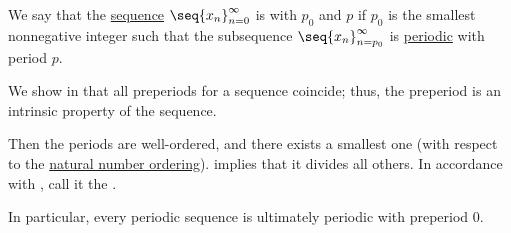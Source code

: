 \begin{definition}\label{def:ultimately_periodic_sequence}
  We say that the \hyperref[def:sequence]{sequence} \( \seq{ x_n }_{n=0}^\infty \) is  with  \( p_0 \) and  \( p \) if \( p_0 \) is the smallest nonnegative integer such that the subsequence \( \seq{ x_n }_{n=p_0}^\infty \) is \hyperref[def:periodic_function]{periodic} with period \( p \).

  We show in  that all preperiods for a sequence coincide; thus, the preperiod is an intrinsic property of the sequence.

  Then the periods are well-ordered, and there exists a smallest one (with respect to the \hyperref[def:natural_numbers_ordering]{natural number ordering}).  implies that it divides all others. In accordance with , call it the .
\end{definition}
\begin{comments}
  \item In particular, every periodic sequence is ultimately periodic with preperiod \( 0 \).
\end{comments}

